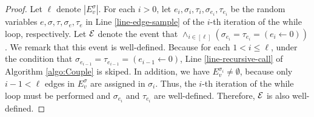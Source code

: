 \documentclass[11pt]{article}
\newcommand{\abs}[1]{\left\vert#1\right\vert}
\def\!#1{\mathtt{#1}}
\begin{document}
\OneroundDecay*
\begin{proof}
Let $\ell$ denote $\abs{E_v^\sigma}$. 
For each $i>0$,
let $e_i, \sigma_i,\tau_i,\sigma_{e_i},\tau_{e_i}$ be the random variables $e,\sigma,\tau,\sigma_{e},\tau_{e}$ in Line \ref{line-edge-sample} of the $i$-th iteration of the while loop, respectively.
Let $\mathcal{E}$ denote the event that 
$\land_{i\in [\ell]}(\sigma_{e_i} = \tau_{e_i} = ( e_i\leftarrow 0))$.
We remark that this event is well-defined.
Because for each $1< i \leq \ell$,
under the condition that $\sigma_{e_{i-1}} = \tau_{e_{i-1}} = (e_{i-1}\leftarrow 0)$, Line \ref{line-recursive-call} of Algorithm \ref{algo:Couple} is skiped.
In addition, we have $E^{\sigma_{i}}_v\neq \emptyset$, because only $i-1<\ell$ edges in $E_v^\sigma$ are assigned in $\sigma_{i}$.
Thus, the $i$-th iteration of the while loop must be performed
and $\sigma_{e_i}$ and $\tau_{e_i}$ are well-defined.
Therefore, $\mathcal{E}$ is also well-defined.



\end{proof}
\end{document}
